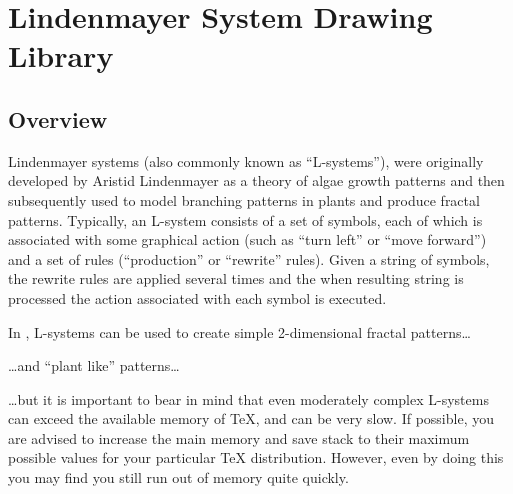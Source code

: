 %
%
%


\section{Lindenmayer System Drawing Library}

\subsection{Overview}

Lindenmayer systems (also commonly known as ``L-systems''), were originally
developed by Aristid Lindenmayer as a theory of algae growth patterns and then
subsequently used to model branching patterns in plants and produce fractal
patterns. Typically, an L-system consists of a set of symbols, each of which is
associated with some graphical action (such as ``turn left'' or ``move
forward'') and a set of rules (``production'' or ``rewrite'' rules). Given a
string of symbols, the rewrite rules are applied several times and the when
resulting string is processed the action associated with each symbol is
executed.

In \pgfname, L-systems can be used to create simple 2-dimensional fractal
patterns\ldots
%
\begin{codeexample}[
    preamble={\usetikzlibrary{lindenmayersystems}},
    pre={\expandafter\let\csname pgf@lsystem@Koch curve\endcsname=\relax},
]
\end{codeexample}
%
\noindent\ldots and ``plant like'' patterns\ldots
%
\begin{codeexample}[preamble={\usetikzlibrary{lindenmayersystems}}]
\end{codeexample}
%
\noindent \ldots but it is important to bear in mind that even moderately
complex L-systems can exceed the available memory of \TeX, and can be very
slow. If possible, you are advised to increase the main memory and save stack
to their maximum possible values for your particular \TeX{} distribution.
However, even by doing this you may find you still run out of memory quite
quickly.

